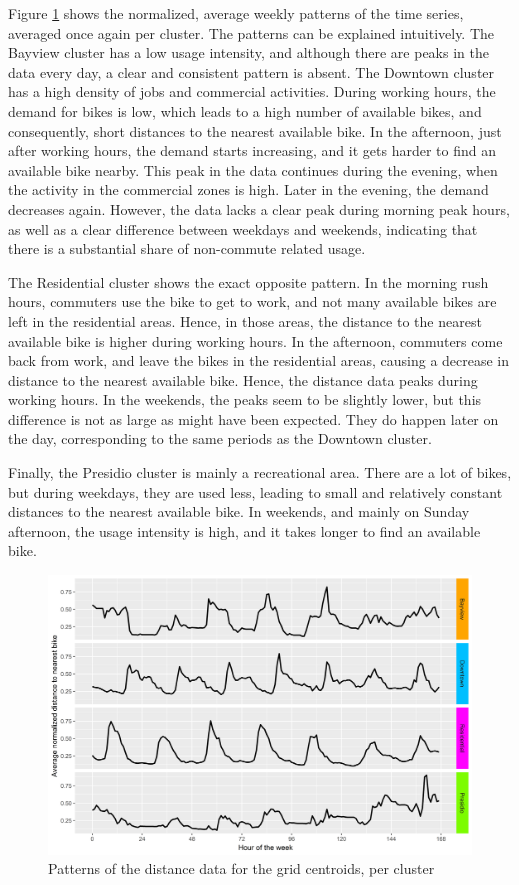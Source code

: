 \documentclass[12pt,oneside]{reedthesis}
\begin{document}
Figure \ref{fig:patterns} shows the normalized, average weekly patterns
of the time series, averaged once again per cluster. The patterns can be
explained intuitively. The Bayview cluster has a low usage intensity,
and although there are peaks in the data every day, a clear and
consistent pattern is absent. The Downtown cluster has a high density of
jobs and commercial activities. During working hours, the demand for
bikes is low, which leads to a high number of available bikes, and
consequently, short distances to the nearest available bike. In the
afternoon, just after working hours, the demand starts increasing, and
it gets harder to find an available bike nearby. This peak in the data
continues during the evening, when the activity in the commercial zones
is high. Later in the evening, the demand decreases again. However, the
data lacks a clear peak during morning peak hours, as well as a clear
difference between weekdays and weekends, indicating that there is a
substantial share of non-commute related usage.

The Residential cluster shows the exact opposite pattern. In the morning
rush hours, commuters use the bike to get to work, and not many
available bikes are left in the residential areas. Hence, in those
areas, the distance to the nearest available bike is higher during
working hours. In the afternoon, commuters come back from work, and
leave the bikes in the residential areas, causing a decrease in distance
to the nearest available bike. Hence, the distance data peaks during
working hours. In the weekends, the peaks seem to be slightly lower, but
this difference is not as large as might have been expected. They do
happen later on the day, corresponding to the same periods as the
Downtown cluster.

Finally, the Presidio cluster is mainly a recreational area. There are a
lot of bikes, but during weekdays, they are used less, leading to small
and relatively constant distances to the nearest available bike. In
weekends, and mainly on Sunday afternoon, the usage intensity is high,
and it takes longer to find an available bike.
\begin{figure}[H]
\includegraphics[width=\textwidth]{Figures/clusterplots} \caption{Patterns of the distance data for the grid centroids, per cluster}\label{fig:patterns}
\end{figure}
\end{document}
